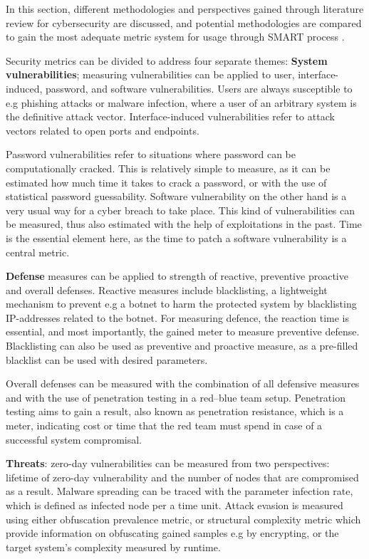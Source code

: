In this section, different methodologies and perspectives gained through literature review for cybersecurity are discussed, and potential methodologies are compared to gain the most adequate metric system for usage through SMART process \cite{payne2006guide}.

Security metrics can be divided to address four separate themes: \textbf{System vulnerabilities}; measuring vulnerabilities can be applied to user, interface-induced, password, and software vulnerabilities. Users are always susceptible to e.g phishing attacks or malware infection, where a user of an arbitrary system is the definitive attack vector. Interface-induced vulnerabilities refer to attack vectors related to open ports and endpoints. \cite{pendleton2016survey}

Password vulnerabilities refer to situations where password can be computationally cracked. This is relatively simple to measure, as it can be estimated how much time it takes to crack a password, or with the use of statistical password guessability. Software vulnerability on the other hand is a very usual way for a cyber breach to take place. This kind of vulnerabilities can be measured, thus also estimated with the help of exploitations in the past. Time is the essential element here, as the time to patch a software vulnerability is a central metric. \cite{pendleton2016survey}

\textbf{Defense} measures can be applied to strength of reactive, preventive proactive and overall defenses. Reactive measures include blacklisting, a lightweight mechanism to prevent e.g a botnet to harm the protected system by blacklisting IP-addresses related to the botnet. For measuring defence, the reaction time is essential, and most importantly, the gained meter to measure preventive defense. Blacklisting can also be used as preventive and proactive measure, as a pre-filled blacklist can be used with desired parameters. \cite{pendleton2016survey} \cite{ramos2017model}

Overall defenses can be measured with the combination of all defensive measures and with the use of penetration testing in a red–blue team setup. Penetration testing aims to gain a result, also known as penetration resistance, which is a meter, indicating cost or time that the red team must spend in case of a successful system compromisal. \cite{pendleton2016survey} \cite{ramos2017model}

\textbf{Threats}: zero-day vulnerabilities can be measured from two perspectives: lifetime of zero-day vulnerability and the number of nodes that are compromised as a result. Malware spreading can be traced with the parameter infection rate, which is defined as infected node per a time unit. Attack evasion is measured using either obfuscation prevalence metric, or structural complexity metric which provide information on obfuscating gained samples e.g by encrypting, or the target system's complexity measured by runtime. \cite{pendleton2016survey} \cite{ramos2017model}

